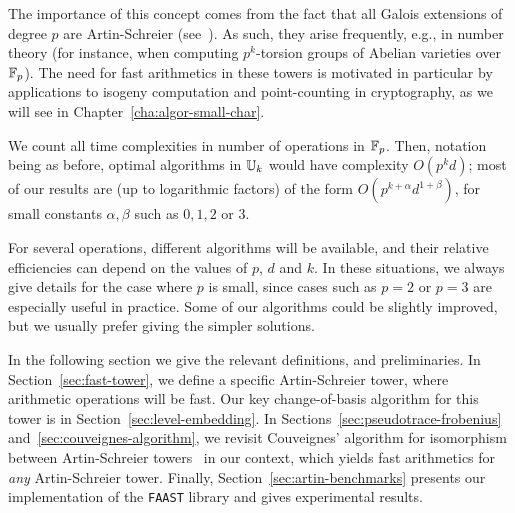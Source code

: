 The importance of this concept comes from the fact that all Galois
extensions of degree $p$ are Artin-Schreier (see~\cite[VI,
$\S6$]{lang}). As such, they arise frequently, e.g., in number theory
(for instance, when computing $p^k$-torsion groups of Abelian
varieties over $\mathbb{F}_p$). The need for fast arithmetics in these towers
is motivated in particular by applications to isogeny computation and
point-counting in cryptography, as we will see in
Chapter~\ref{cha:algor-small-char}.

We count all time complexities in number of operations in
$\mathbb{F}_p$. Then, notation being as before, optimal algorithms in $\mathbb{U}_k$
would have complexity $O(p^kd)$; most of our results are (up to
logarithmic factors) of the form $O(p^{k+\alpha} d^{1+\beta})$, for
small constants $\alpha,\beta$ such as $0,1,2$ or $3$.

For several operations, different algorithms will be available, and
their relative efficiencies can depend on the values of $p$, $d$ and
$k$. In these situations, we always give details for the case where
$p$ is small, since cases such as $p=2$ or $p=3$ are especially useful
in practice. Some of our algorithms could be slightly
improved, but we usually prefer giving the simpler solutions.

In the following section we give the relevant definitions, and
preliminaries. In Section~\ref{sec:fast-tower}, we define a specific
Artin-Schreier tower, where arithmetic operations will be fast. Our
key change-of-basis algorithm for this tower is in
Section~\ref{sec:level-embedding}. In
Sections~\ref{sec:pseudotrace-frobenius}
and~\ref{sec:couveignes-algorithm}, we revisit Couveignes' algorithm
for isomorphism between Artin-Schreier towers~\cite{couveignes00} in
our context, which yields fast arithmetics for {\em any}
Artin-Schreier tower. Finally, Section~\ref{sec:artin-benchmarks} presents
our implementation of the \texttt{FAAST} library and gives
experimental results.



%
